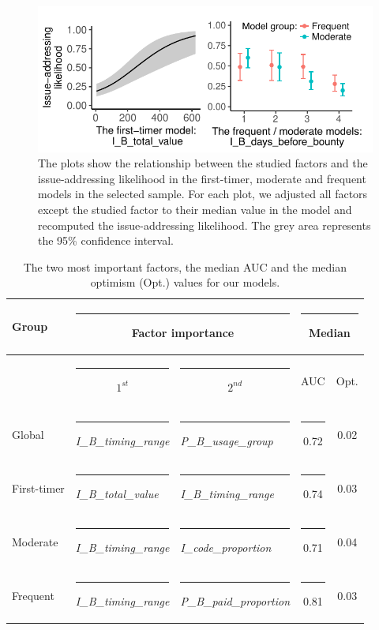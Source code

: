 \begin{figure}[t]
\centering\includegraphics[width=1.03\columnwidth ]{pics/rq3/split/rq3_trendMergeMerge}
\caption{The plots show the relationship between the studied factors and the issue-addressing likelihood in the first-timer, moderate and frequent models in the selected sample. For each plot, we adjusted all factors except the studied factor to their median value in the model and recomputed the issue-addressing likelihood. The grey area represents the 95\% confidence interval.}
\vspace{-0.1in}
\label{fig:rq3_trend_two}
\end{figure}

 \begin{table}[t]
   \centering
   \caption{The two most important factors, the median AUC and the median optimism (Opt.) values for our models.}
     \begin{tabular}{lp{8em}lcc}
     \toprule
     \textbf{Group} & \multicolumn{2}{c}{\rule{-14pt}{0pt} \textbf{Factor importance}} & \multicolumn{2}{c}{\rule{-11pt}{0pt}\textbf{Median}}\\
     \midrule
           & \multicolumn{1}{c}{\rule{-13pt}{0pt}$1^{st}$} & \multicolumn{1}{c}{\rule{-14pt}{0pt} $2^{nd}$} &  AUC & Opt.\\
     \midrule
     Global  &\rule{-13pt}{0pt} \textit{I\_B\_timing\_range} &\rule{-14pt}{0pt} \textit{P\_B\_usage\_group} &\rule{-11pt}{0pt} 0.72 & 0.02 \\
     
First-timer &\rule{-13pt}{0pt} \textit{I\_B\_total\_value} &\rule{-14pt}{0pt} \textit{I\_B\_timing\_range} &\rule{-11pt}{0pt} 0.74 & 0.03 \\

  Moderate &\rule{-13pt}{0pt} \textit{I\_B\_timing\_range} &\rule{-14pt}{0pt} \textit{I\_code\_proportion} &\rule{-11pt}{0pt} 0.71& 0.04 \\

   Frequent &\rule{-13pt}{0pt} \textit{I\_B\_timing\_range} &\rule{-14pt}{0pt} \textit{P\_B\_paid\_proportion} &\rule{-11pt}{0pt} 0.81 & 0.03 \\
     \bottomrule
     \end{tabular}%
   \label{tab:top3impFactors}%
   \vspace{-0.2in}
 \end{table}%


